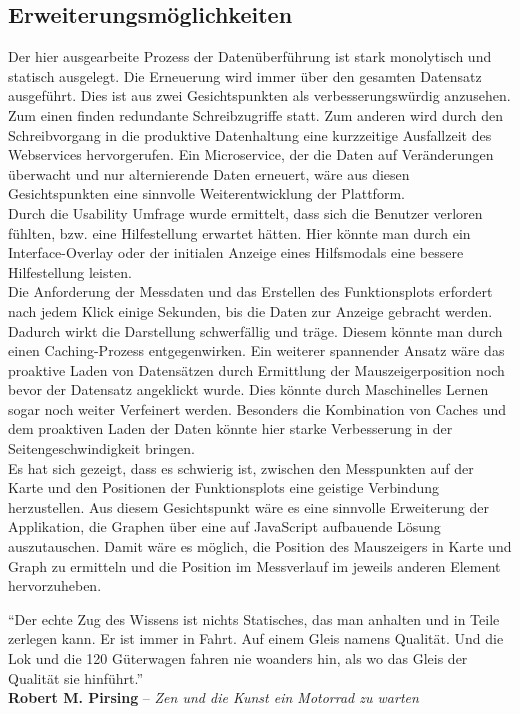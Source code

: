 \subsection{Erweiterungsmöglichkeiten}

Der hier ausgearbeite Prozess der Datenüberführung ist stark monolytisch und statisch ausgelegt. Die Erneuerung wird immer über den gesamten Datensatz ausgeführt.
Dies ist aus zwei Gesichtspunkten als verbesserungswürdig anzusehen. Zum einen finden redundante Schreibzugriffe statt. Zum anderen wird durch den Schreibvorgang in die produktive Datenhaltung eine kurzzeitige Ausfallzeit des Webservices hervorgerufen.
Ein Microservice, der die Daten auf Veränderungen überwacht und nur alternierende Daten erneuert, wäre aus diesen Gesichtspunkten eine sinnvolle Weiterentwicklung der Plattform. 
\\

Durch die Usability Umfrage wurde ermittelt, dass sich die Benutzer verloren fühlten, bzw. eine Hilfestellung erwartet hätten. Hier könnte man durch ein Interface-Overlay oder der initialen Anzeige eines Hilfsmodals eine bessere Hilfestellung leisten.
\\

Die Anforderung der Messdaten und das Erstellen des Funktionsplots erfordert nach jedem Klick einige Sekunden, bis die Daten zur Anzeige gebracht werden. Dadurch wirkt die Darstellung schwerfällig und träge. Diesem könnte man durch einen Caching-Prozess entgegenwirken. Ein weiterer spannender Ansatz wäre das proaktive Laden von Datensätzen durch Ermittlung der Mauszeigerposition noch bevor der Datensatz angeklickt wurde. Dies könnte durch Maschinelles Lernen sogar noch weiter Verfeinert werden. Besonders die Kombination von Caches und dem proaktiven Laden der Daten könnte hier starke Verbesserung in der Seitengeschwindigkeit bringen. 
\\

Es hat sich gezeigt, dass es schwierig ist, zwischen den Messpunkten auf der Karte und den Positionen der Funktionsplots eine geistige Verbindung herzustellen. Aus diesem Gesichtspunkt wäre es eine sinnvolle Erweiterung der Applikation, die Graphen über eine auf JavaScript aufbauende Lösung auszutauschen. Damit wäre es möglich, die Position des Mauszeigers in Karte und Graph zu ermitteln und die Position im Messverlauf im jeweils anderen Element hervorzuheben.  


\newpage


\vspace*{\fill}\thispagestyle{plain}
"`Der echte Zug des Wissens ist nichts Statisches, das man anhalten und in Teile zerlegen kann. Er ist immer in Fahrt. Auf einem Gleis namens Qualität. Und die Lok und die 120 Güterwagen fahren nie woanders hin, als wo das Gleis der Qualität sie hinführt."'
\\
\hrulefill \vspace{0.3cm}
\textbf{Robert M. Pirsing} -- \textit{Zen und die Kunst ein Motorrad zu warten}
\vspace*{\fill}
